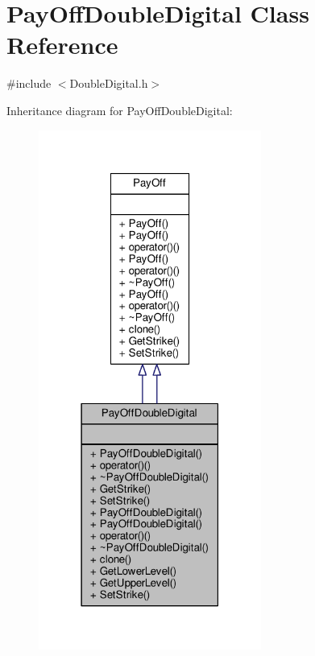 \hypertarget{classPayOffDoubleDigital}{}\section{Pay\+Off\+Double\+Digital Class Reference}
\label{classPayOffDoubleDigital}


{\ttfamily \#include $<$Double\+Digital.\+h$>$}



Inheritance diagram for Pay\+Off\+Double\+Digital\+:
\nopagebreak
\begin{figure}[H]
\begin{center}
\leavevmode
\includegraphics[width=207pt]{classPayOffDoubleDigital__inherit__graph}
\end{center}
\end{figure}


